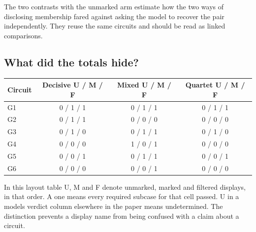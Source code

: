\documentclass[12pt,letterpaper]{article}
\begin{document}
The two contrasts with the unmarked arm estimate how the two ways of disclosing membership fared against asking the model to recover the pair independently. They reuse the same circuits and should be read as linked comparisons.

\subsection{What did the totals hide?}

\begin{center}{\small\setlength{\tabcolsep}{4pt}\begin{tabularx}{\linewidth}{@{}Yccc@{}}\toprule
Circuit & Decisive U / M / F & Mixed U / M / F & Quartet U / M / F\\ \midrule
G1 & 0 / 1 / 1 & 0 / 1 / 1 & 0 / 1 / 1\\
G2 & 0 / 1 / 1 & 0 / 0 / 0 & 0 / 0 / 0\\
G3 & 0 / 1 / 0 & 0 / 1 / 1 & 0 / 1 / 0\\
G4 & 0 / 0 / 0 & 1 / 0 / 1 & 0 / 0 / 0\\
G5 & 0 / 0 / 1 & 0 / 1 / 1 & 0 / 0 / 1\\
G6 & 0 / 0 / 0 & 0 / 0 / 1 & 0 / 0 / 0\\\bottomrule\end{tabularx}}\end{center}

In this layout table U, M and F denote unmarked, marked and filtered displays, in that order. A one means every required subcase for that cell passed. U in a model\textquotesingle{}s verdict column elsewhere in the paper means undetermined. The distinction prevents a display name from being confused with a claim about a circuit.
\end{document}

